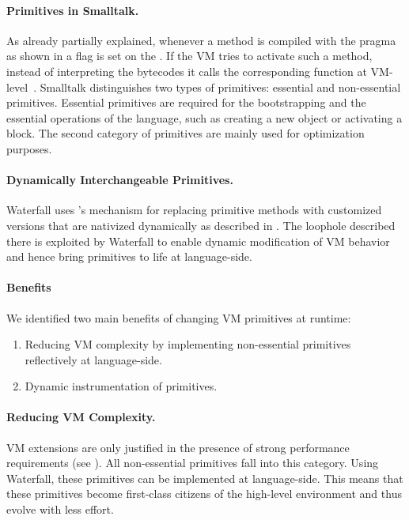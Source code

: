 \paragraph{Primitives in Smalltalk.}
As already partially explained, whenever a method is compiled with the  pragma as shown in  a flag is set on the . 
If the VM tries to activate such a method, instead of interpreting the bytecodes it calls the corresponding function at VM-level~\cite{Gold83a}.
Smalltalk distinguishes two types of primitives: essential and non-essential primitives.
Essential primitives are required for the bootstrapping and the essential operations of the language, such as creating a new object or activating a block.
The second category of primitives are mainly used for optimization purposes.

\paragraph{Dynamically Interchangeable Primitives.}
Waterfall uses \B's mechanism for replacing primitive methods with customized versions that are nativized dynamically as described in .
The loophole described there is exploited by Waterfall to enable dynamic modification of VM behavior and hence bring primitives to life at language-side.


\paragraph{Benefits} 
We identified two main benefits of changing VM primitives at runtime:

\begin{enumerate}
	\item Reducing VM complexity by implementing non-essential primitives reflectively at language-side.
	\item Dynamic instrumentation of primitives.
\end{enumerate}

\paragraph{Reducing VM Complexity.}
VM extensions are only justified in the presence of strong performance requirements (see ).
All non-essential primitives fall into this category.
Using Waterfall, these primitives can be implemented at language-side.
This means that these primitives become first-class citizens of the high-level environment and thus evolve with less effort.

